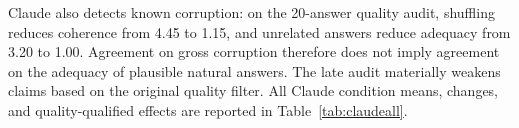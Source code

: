 Claude also detects known corruption: on the 20-answer quality audit, shuffling reduces coherence from 4.45 to 1.15, and unrelated answers reduce adequacy from 3.20 to 1.00. Agreement on gross corruption therefore does not imply agreement on the adequacy of plausible natural answers. The late audit materially weakens claims based on the original quality filter. All Claude condition means, changes, and quality-qualified effects are reported in Table~\ref{tab:claudeall}.

